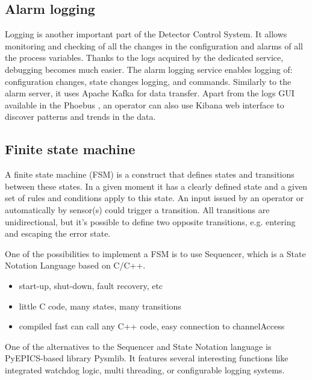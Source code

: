 \subsection{Alarm logging}
Logging is another important part of the Detector Control System. It allows monitoring and checking of all the changes in the configuration and alarms of all the process variables. Thanks to the logs acquired by the dedicated service, debugging becomes much easier. The alarm logging service enables logging of: configuration changes, state changes logging, and commands. Similarly to the alarm server, it uses Apache Kafka for data transfer. Apart from the logs \gls{GUI} available in the Phoebus \cite{alarm_logger}, an operator can also use Kibana web interface to discover patterns and trends in the data. 

\subsection{Finite state machine}
A finite state machine (\gls{FSM}) is a construct that defines states and transitions between these states. In a given moment it has a clearly defined state and a given set of rules and conditions apply to this state. An input issued by an operator or automatically by sensor(s) could trigger a transition. All transitions are unidirectional, but it's possible to define two opposite transitions, e.g. entering and escaping the error state. 

One of the possibilities to implement a \gls{FSM} is to use Sequencer, which is a State Notation Language based on C/C++. 
\begin{itemize}
    \item start-up, shut-down, fault recovery, etc
    \item little C code, many states, many transitions
    \item compiled fast can call any C++ code, easy connection to channelAccess 
\end{itemize}
One of the alternatives to the Sequencer and State Notation language is PyEPICS-based library Pysmlib. It features several interesting functions like integrated watchdog logic, multi threading, or configurable logging systems.


